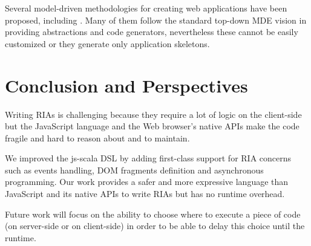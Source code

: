 \documentclass[american,english,runningheads]{llncs}
\begin{document}
Several model-driven methodologies for creating web applications have been proposed, including
\cite{schwabe1996systematic,lima2003modeling,ceri2000web,koch2001authoring,pastor2003oows,valverde2007mda,vdovjak2003engineering,kraus2007model,nunes2006rapid,brambilla2008designing,valderas2007transformational,van2006hera,Groenewegen08_WebDSL}.
Many of them follow the standard top-down MDE vision in providing abstractions and code generators, nevertheless
these cannot be easily customized or they generate only application skeletons.

\section{Conclusion and Perspectives}
\label{discussion}

Writing RIAs is challenging because they require a lot of logic on the client-side but the JavaScript language and
the Web browser’s native APIs make the code fragile and hard to reason about and to maintain.

We improved the js-scala DSL by adding first-class support for RIA concerns such as events handling,
DOM fragments definition and asynchronous programming. Our work provides a safer and more expressive language than
JavaScript and its native APIs to write RIAs but has no runtime overhead.

Future work will focus on the ability to choose where to execute a piece of code (on server-side or on client-side)
in order to be able to delay this choice until the runtime.



\end{document}
